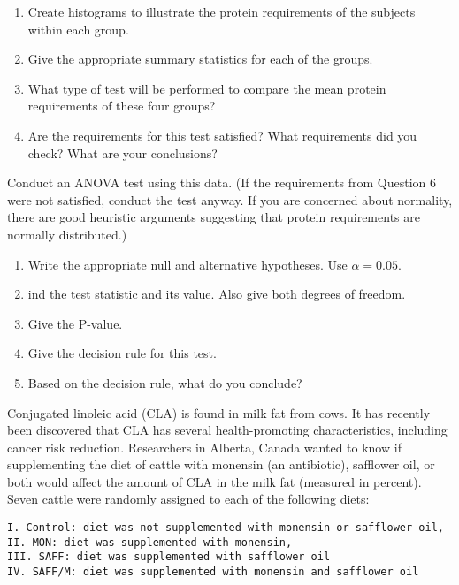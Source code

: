 \documentclass[]{article}
\begin{document}
\begin{enumerate}
\def\labelenumi{\arabic{enumi}.}
\setcounter{enumi}{2}
\item
  Create histograms to illustrate the protein requirements of the
  subjects within each group.
\item
  Give the appropriate summary statistics for each of the groups.
\item
  What type of test will be performed to compare the mean protein
  requirements of these four groups?
\item
  Are the requirements for this test satisfied? What requirements did
  you check? What are your conclusions?
\end{enumerate}

Conduct an ANOVA test using this data. (If the requirements from
Question 6 were not satisfied, conduct the test anyway. If you are
concerned about normality, there are good heuristic arguments suggesting
that protein requirements are normally distributed.)

\begin{enumerate}
\def\labelenumi{\arabic{enumi}.}
\setcounter{enumi}{6}
\item
  Write the appropriate null and alternative hypotheses. Use
  \(\alpha = 0.05\).
\item
  ind the test statistic and its value. Also give both degrees of
  freedom.
\item
  Give the P-value.
\item
  Give the decision rule for this test.
\item
  Based on the decision rule, what do you conclude?
\end{enumerate}

Conjugated linoleic acid (CLA) is found in milk fat from cows. It has
recently been discovered that CLA has several health-promoting
characteristics, including cancer risk reduction. Researchers in
Alberta, Canada wanted to know if supplementing the diet of cattle with
monensin (an antibiotic), safflower oil, or both would affect the amount
of CLA in the milk fat (measured in percent). Seven cattle were randomly
assigned to each of the following diets:

\begin{verbatim}
I. Control: diet was not supplemented with monensin or safflower oil,
II. MON: diet was supplemented with monensin,
III. SAFF: diet was supplemented with safflower oil
IV. SAFF/M: diet was supplemented with monensin and safflower oil
\end{verbatim}
\end{document}
